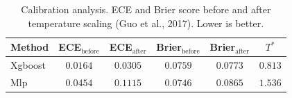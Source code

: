 \begin{table}[t]
\centering
\caption{Calibration analysis. ECE and Brier score before and after temperature scaling (Guo et al., 2017). Lower is better.}
\label{tab:calibration}
\begin{tabular}{l cc cc c}
\toprule
Method & ECE$_\text{before}$ & ECE$_\text{after}$ & Brier$_\text{before}$ & Brier$_\text{after}$ & $T^*$ \\
\midrule
Xgboost & $0.0164$ & $0.0305$ & $0.0759$ & $0.0773$ & $0.813$ \\
Mlp & $0.0454$ & $0.1115$ & $0.0746$ & $0.0865$ & $1.536$ \\
\bottomrule
\end{tabular}
\end{table}